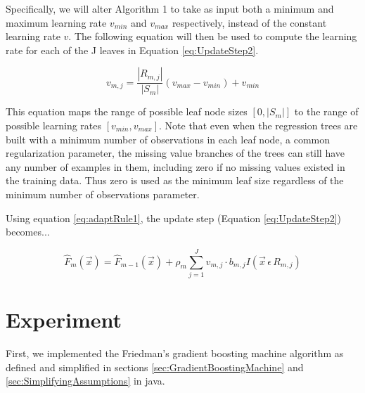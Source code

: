 \documentclass[conference]{IEEEtran}
\begin{document}
Specifically, we will alter Algorithm 1 to take as input both a minimum and maximum learning rate \(v_{min}\) and \(v_{max}\) respectively, instead of the constant learning rate \(v\). The following equation will then be used to compute the learning rate for each of the J leaves in Equation \ref{eq:UpdateStep2}.
	
\begin{equation}
v_{m,j} = \frac{|R_{m,j}|}{{|S_m|}}(v_{max} - v_{min})  + v_{min}
	\label{eq:adaptRule1}
\end{equation}

This equation maps the range of possible leaf node sizes \([0, |S_m|]\) to the range of possible learning rates \([v_{min}, v_{max}]\). Note that even when the regression trees are built with a minimum number of observations in each leaf node, a common regularization parameter, the missing value branches of the trees can still have any number of examples in them, including zero if no missing values existed in the training data. Thus zero is used as the minimum leaf size regardless of the minimum number of observations parameter. 

Using equation \ref{eq:adaptRule1}, the update step (Equation \ref{eq:UpdateStep2}) becomes...

\begin{equation}
	\hat{F}_m(\vec{x}) = \hat{F}_{m-1}(\vec{x}) + \rho_m\sum_{j=1}^{J}v_{m,j}  \cdot  b_{m,j}I(\vec{x} \, \epsilon \, R_{m,j})
	\label{eq:revisedUpdateStep}
\end{equation}
	
\section{Experiment}
First, we implemented the Friedman's gradient boosting machine algorithm as defined and simplified in sections \ref{sec:GradientBoostingMachine} and \ref{sec:SimplifyingAssumptions} in java.


%
%
\end{document}
